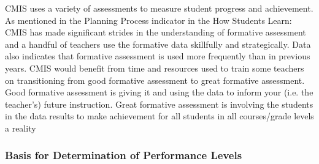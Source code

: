 \begin{findings}
CMIS uses a variety of assessments to measure  student progress and achievement. As mentioned in the Planning Process indicator in the How Students Learn: CMIS has made significant strides in the understanding of formative assessment and a handful of teachers use the formative data skillfully and strategically. Data also indicates that formative assessment is used more frequently than in previous years. CMIS would benefit from time and resources used to train some teachers on transitioning from good formative assessment to great formative assessment. Good formative assessment is giving it and using the data to inform your (i.e. the teacher’s) future instruction. Great formative assessment is involving the students in the data results to make achievement for all students in all courses/grade levels a reality
\end{findings}

\subsubsection{Basis for Determination of Performance Levels}



